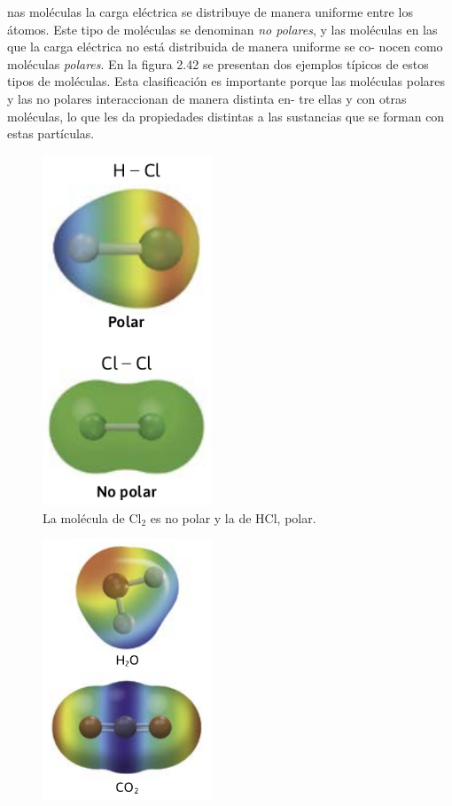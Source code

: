 \documentclass[12pt]{guia}
\begin{document}
\begin{questions}
{\begin{tcolorbox}
            nas moléculas la carga eléctrica se distribuye de manera uniforme entre los
            átomos. Este tipo de moléculas se denominan \emph{no polares}, y las moléculas
            en las que la carga eléctrica no está distribuida de manera uniforme se co-
            nocen como moléculas \emph{polares}. En la figura 2.42 se presentan dos ejemplos
            típicos de estos tipos de moléculas. Esta clasificación es importante porque
            las moléculas polares y las no polares interaccionan de manera distinta en-
            tre ellas y con otras moléculas, lo que les da propiedades distintas a las
            sustancias que se forman con estas partículas.
            \begin{figure}[H]
                \includegraphics[width=0.45\textwidth]{../images/20230321055533}
                \caption{La molécula de Cl$_2$ es no polar y la de HCl, polar.}
                \label{fig:20230321055533}
            \end{figure}
            \begin{figure}[H]
                \includegraphics[width=0.45\textwidth]{../images/20230321055646}

\end{figure}
\end{tcolorbox}}
\end{questions}
\end{document}
